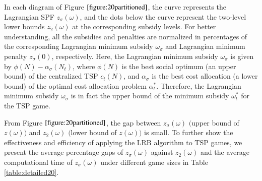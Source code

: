 \documentclass[authoryear,review,12pt]{elsarticle}
\begin{document}
In each diagram of Figure $\ref{figure:20partitioned}$, the curve represents the Lagrangian SPF $z_{\sigma}(\omega)$, and the dots below the curve represent the two-level lower bounds $z_{2}(\omega)$ at the corresponding subsidy levels.
For better understanding, all the subsidies and penalties are normalized in percentages of the corresponding Lagrangian minimum subsidy $\omega_{\sigma}$ and Lagrangian minimum penalty $z_{\sigma}(0)$, respectively.
Here, the Lagrangian minimum subsidy $\omega_{\sigma}$ is given by $\phi(N) - \alpha_{\sigma}(N_t)$, where $\phi(N)$ is the best social optimum (an upper bound) of the centralized TSP $c_t(N)$, and $\alpha_{\sigma}$ is the best cost allocation (a lower bound) of the optimal cost allocation problem $\alpha_t^*$.
Therefore, the Lagrangian minimum subsidy $\omega_{\sigma}$ is in fact the upper bound of the minimum subsidy $\omega_t^*$ for the TSP game.


From Figure $\ref{figure:20partitioned}$, the gap between $z_{\sigma}(\omega)$ $\big($upper bound of $z(\omega)$$\big)$ and $z_2(\omega)$ $\big($lower bound of $z(\omega)$$\big)$ is small.
To further show the effectiveness and efficiency of applying the LRB algorithm to TSP games, we present the average percentage gaps of $z_{\sigma}(\omega)$ against $z_2(\omega)$ and the average computational time of $z_{\sigma}(\omega)$ under different game sizes in Table \ref{table:detailed20}.
\end{document}
